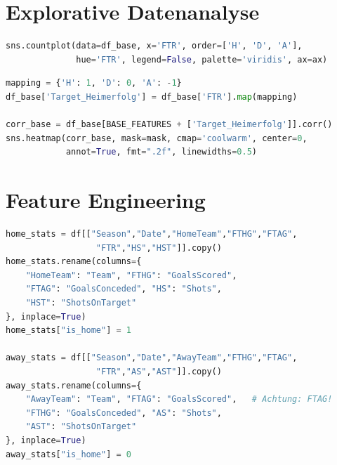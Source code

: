 \section{Explorative Datenanalyse}

\begin{lstlisting}[language=Python, caption={Visualisierung der FTR-Klassenverteilung},
                   label={lst:ftr-plot}]
sns.countplot(data=df_base, x='FTR', order=['H', 'D', 'A'],
              hue='FTR', legend=False, palette='viridis', ax=ax)
\end{lstlisting}

\begin{lstlisting}[language=Python, caption={Numerische Kodierung der Zielvariable und Korrelationsmatrix},
                   label={lst:korr}]
mapping = {'H': 1, 'D': 0, 'A': -1}
df_base['Target_Heimerfolg'] = df_base['FTR'].map(mapping)

corr_base = df_base[BASE_FEATURES + ['Target_Heimerfolg']].corr()
sns.heatmap(corr_base, mask=mask, cmap='coolwarm', center=0,
            annot=True, fmt=".2f", linewidths=0.5)
\end{lstlisting}

\section{Feature Engineering}

\begin{lstlisting}[language=Python, caption={Transformation der Spieldaten ins Team-Spiel-Format},
                   label={lst:longformat}]
home_stats = df[["Season","Date","HomeTeam","FTHG","FTAG",
                  "FTR","HS","HST"]].copy()
home_stats.rename(columns={
    "HomeTeam": "Team", "FTHG": "GoalsScored",
    "FTAG": "GoalsConceded", "HS": "Shots",
    "HST": "ShotsOnTarget"
}, inplace=True)
home_stats["is_home"] = 1

away_stats = df[["Season","Date","AwayTeam","FTHG","FTAG",
                  "FTR","AS","AST"]].copy()
away_stats.rename(columns={
    "AwayTeam": "Team", "FTAG": "GoalsScored",   # Achtung: FTAG!
    "FTHG": "GoalsConceded", "AS": "Shots",
    "AST": "ShotsOnTarget"
}, inplace=True)
away_stats["is_home"] = 0
\end{lstlisting}

